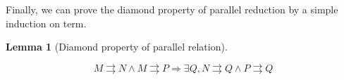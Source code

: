 \documentclass[preprint,10pt]{sigplanconf}
\newcommand{\p}{\ensuremath{\rightrightarrows}}
\newtheorem{lemma}{Lemma}
\begin{document}
Finally, we can prove the diamond property of parallel reduction by a simple induction on term.


    \begin{lemma}[Diamond property of parallel relation]
    \label{pdiamond}

    \[ M \p N \wedge M \p P \Rightarrow \exists Q, N \p Q \wedge P \p  Q  \]



  \end{lemma}
\end{document}
